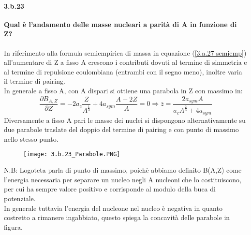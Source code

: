 \documentclass[twoside]{article}
\begin{document}
\paragraph{3.b.23}\textbf{Qual è l'andamento delle masse nucleari a parità di A in funzione di Z?}\\
\\
In riferimento alla formula semiempirica di massa in equazione (\ref{3.a.27 semiemp}) all'aumentare di Z a fisso A crescono i contributi dovuti al termine di simmetria e al termine di repulsione coulombiana (entrambi con il segno meno), inoltre varia il termine di pairing.\\
In generale a fisso A, con A dispari si ottiene una parabola in Z con massimo in:
\begin{equation}
    \frac{\partial B_{A,Z}}{\partial Z}=-2a_c\frac{Z}{A^{\frac{1}{3}}}+4a_{sym} \frac{A-2Z}{A}=0\Longrightarrow \bar{z}=\frac{2a_{sym}A}{a_cA^{\frac{2}{3}}+4a_{sym}}
\end{equation}
Diversamente a fisso A pari le masse dei nuclei si dispongono
alternativamente su due parabole traslate del doppio del termine di pairing e con punto di massimo nello stesso punto.\\
\begin{figure}[ht]
    \centering
    \texttt{[image: 3.b.23\_Parabole.PNG]}
    \label{3.b.23_Parabole}
\end{figure}
N.B: Logoteta parla di punto di massimo, poichè abbiamo definito B(A,Z) come l'energia necessaria per separare un nucleo negli A nucleoni che lo costituiscono, per cui ha sempre valore positivo e corrisponde al modulo della buca di potenziale.\\
In generale tuttavia l'energia del nucleone nel nucleo è negativa in quanto costretto a rimanere ingabbiato, questo spiega la concavità delle parabole in figura.\\
\end{document}
